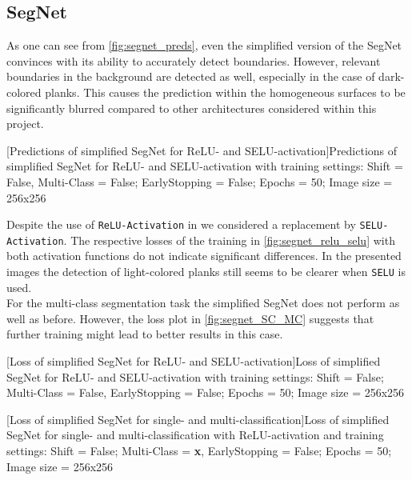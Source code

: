 \subsection{SegNet}\label{subsec:SegNet}
As one can see from \cref{fig:segnet_preds}, even the simplified version of the SegNet convinces with its ability to accurately detect boundaries. However, relevant boundaries in the background are detected as well, especially in the case of dark-colored planks. This causes the prediction within the homogeneous surfaces to be significantly blurred compared to other architectures considered within this project. 
\begin{minipage}{\textwidth}
    \hspace{0.2cm}
	[Predictions of simplified SegNet for ReLU- and SELU-activation]{Predictions of simplified SegNet for ReLU- and SELU-activation with training settings: Shift = False, Multi-Class = False; EarlyStopping = False; Epochs = 50; Image size = 256x256}
	\label{fig:segnet_preds}
	\vspace{5mm}
\end{minipage}
Despite the use of \verb|ReLU-Activation| in \cite{Badrinarayanan.2017} we considered a replacement by \verb|SELU-Activation|. The respective losses of the training in \cref{fig:segnet_relu_selu} with both activation functions do not indicate significant differences. In the presented images the detection of light-colored planks still seems to be clearer when \verb|SELU| is used.\\
For the multi-class segmentation task the simplified SegNet does not perform as well as before. However, the loss plot in \cref{fig:segnet_SC_MC} suggests that further training might lead to better results in this case.

\begin{minipage}{\textwidth}
	
	[Loss of simplified SegNet for ReLU- and SELU-activation]{Loss of simplified SegNet for ReLU- and SELU-activation with training settings: Shift = False; Multi-Class = False, EarlyStopping = False; Epochs = 50; Image size = 256x256}
	\label{fig:segnet_relu_selu}
	\vspace{5mm}
\end{minipage}

\begin{minipage}{\textwidth}
	
	[Loss of simplified SegNet for single- and multi-classification]{Loss of simplified SegNet for single- and multi-classification with ReLU-activation and training settings: Shift = False; Multi-Class = \textbf{x}, EarlyStopping = False; Epochs = 50; Image size = 256x256}
	\label{fig:segnet_SC_MC}
	\vspace{5mm}
\end{minipage}





